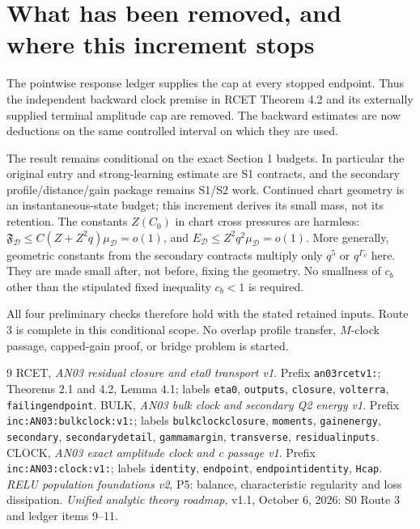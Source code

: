 \documentclass[11pt]{article}
\theoremstyle{remark}\newtheorem{remark}[theorem]{Remark}
\begin{document}
\section{What has been removed, and where this increment stops}
The pointwise response ledger supplies the cap at every stopped
endpoint. Thus the independent backward clock premise in RCET
Theorem 4.2 and its externally supplied terminal amplitude cap are
removed. The backward estimates are now deductions on the same
controlled interval on which they are used.

The result remains conditional on the exact Section 1 budgets.
In particular the original entry and strong-learning estimate are
S1 contracts, and the secondary profile/distance/gain package remains
S1/S2 work. Continued chart geometry is an instantaneous-state
budget; this increment derives its small mass, not its retention.
The constants $Z(C_0)$ in chart cross pressures are harmless:
$\mathfrak F_{\mathcal D}\le C(Z+Z^2q)\mu_{\mathcal D}=o(1)$,
and $E_{\mathcal D}\le Z^2q^2\mu_{\mathcal D}=o(1)$.
More generally, geometric constants from the secondary contracts
multiply only $q^5$ or $q^{\Gamma_\nu}$ here. They are made small
after, not before, fixing the geometry. No smallness of $c_b$ other
than the stipulated fixed inequality $c_b<1$ is required.

All four preliminary checks therefore hold with the stated retained
inputs. Route 3 is complete in this conditional scope. No overlap
profile transfer, $M$-clock passage, capped-gain proof, or bridge
problem is started.

\begin{thebibliography}{9}\small
{} RCET, \emph{AN03 residual closure and eta0 transport v1}.
Prefix \texttt{an03rcetv1:}; Theorems 2.1 and 4.2,
Lemma 4.1; labels \texttt{eta0}, \texttt{outputs}, \texttt{closure},
\texttt{volterra}, \texttt{failingendpoint}.
 BULK, \emph{AN03 bulk clock and secondary Q2 energy v1}.
Prefix \texttt{inc:AN03:bulkclock:v1:}; labels
\texttt{bulkclockclosure}, \texttt{moments}, \texttt{gainenergy},
\texttt{secondary}, \texttt{secondarydetail}, \texttt{gammamargin},
\texttt{transverse}, \texttt{residualinputs}.
 CLOCK, \emph{AN03 exact amplitude clock and c passage v1}.
Prefix \texttt{inc:AN03:clock:v1:}; labels \texttt{identity},
\texttt{endpoint}, \texttt{endpointidentity}, \texttt{Hcap}.
 \emph{RELU population foundations v2}, P5:
balance, characteristic regularity and loss dissipation.
 \emph{Unified analytic theory roadmap}, v1.1,
October 6, 2026: S0 Route 3 and ledger items 9--11.
\end{thebibliography}
\end{document}
